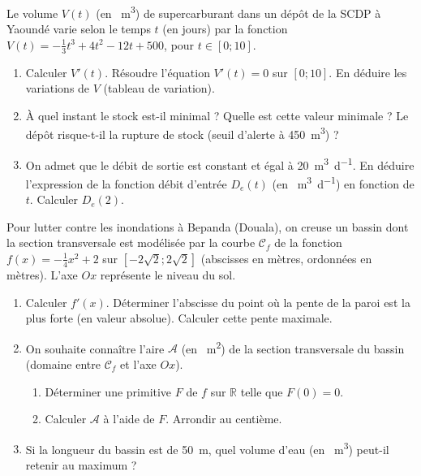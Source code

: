 \documentclass[11pt]{article}
\begin{document}
\begin{exercice}
Le volume $V(t)$ (en \SI{}{\cubic\meter}) de supercarburant dans un dépôt de la SCDP à Yaoundé varie selon le temps $t$ (en jours) par la fonction $V(t) = -\frac{1}{3}t^3 + 4t^2 - 12t + 500$, pour $t \in [0; 10]$.
\begin{enumerate}
    \item Calculer $V'(t)$. Résoudre l'équation $V'(t) = 0$ sur $[0; 10]$. En déduire les variations de $V$ (tableau de variation).
    \item À quel instant le stock est-il minimal ? Quelle est cette valeur minimale ? Le dépôt risque-t-il la rupture de stock (seuil d'alerte à \SI{450}{\cubic\meter}) ?
    \item On admet que le débit de sortie est constant et égal à \SI{20}{\cubic\meter\per\day}. En déduire l'expression de la fonction débit d'entrée $D_e(t)$ (en \SI{}{\cubic\meter\per\day}) en fonction de $t$. Calculer $D_e(2)$.
\end{enumerate}
\end{exercice}

\begin{exercice}
Pour lutter contre les inondations à Bepanda (Douala), on creuse un bassin dont la section transversale est modélisée par la courbe $\mathcal{C}_f$ de la fonction $f(x) = -\frac{1}{4}x^2 + 2$ sur $[-2\sqrt{2}; 2\sqrt{2}]$ (abscisses en mètres, ordonnées en mètres). L'axe $Ox$ représente le niveau du sol.
\begin{enumerate}
    \item Calculer $f'(x)$. Déterminer l'abscisse du point où la pente de la paroi est la plus forte (en valeur absolue). Calculer cette pente maximale.
    \item On souhaite connaître l'aire $\mathcal{A}$ (en \SI{}{\square\meter}) de la section transversale du bassin (domaine entre $\mathcal{C}_f$ et l'axe $Ox$).
    \begin{enumerate}
        \item Déterminer une primitive $F$ de $f$ sur $\mathbb{R}$ telle que $F(0) = 0$.
        \item Calculer $\mathcal{A}$ à l'aide de $F$. Arrondir au centième.
    \end{enumerate}
    \item Si la longueur du bassin est de \SI{50}{\meter}, quel volume d'eau (en \SI{}{\cubic\meter}) peut-il retenir au maximum ?
\end{enumerate}
\end{exercice}
\end{document}
